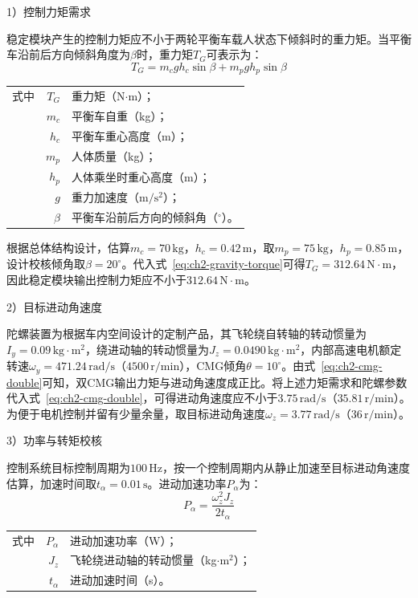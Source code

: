 1）控制力矩需求

稳定模块产生的控制力矩应不小于两轮平衡车载人状态下倾斜时的重力矩。当平衡车沿前后方向倾斜角度为$\beta$时，重力矩$T_G$可表示为：
\begin{equation}
T_G = m_c g h_c \sin\beta + m_p g h_p \sin\beta
\label{eq:ch2-gravity-torque}
\end{equation}
\begin{tabularx}{\textwidth}{@{}l@{\quad}r@{———}X@{}}
式中& $T_G$ & 重力矩（N$\cdot$m）；\\
& $m_c$ & 平衡车自重（kg）；\\
& $h_c$ & 平衡车重心高度（m）；\\
& $m_p$ & 人体质量（kg）；\\
& $h_p$ & 人体乘坐时重心高度（m）；\\
& $g$ & 重力加速度（$\mathrm{m/s^2}$）；\\
& $\beta$ & 平衡车沿前后方向的倾斜角（$^\circ$）。\\
\end{tabularx}\vspace{3.15bp}

根据总体结构设计，估算$m_c=70\,\mathrm{kg}$，$h_c=0.42\,\mathrm{m}$，取$m_p=75\,\mathrm{kg}$，$h_p=0.85\,\mathrm{m}$，设计校核倾角取$\beta=20^\circ$。代入式~\eqref{eq:ch2-gravity-torque}可得$T_G=312.64\,\mathrm{N\cdot m}$，因此稳定模块输出控制力矩应不小于$312.64\,\mathrm{N\cdot m}$。

2）目标进动角速度

陀螺装置为根据车内空间设计的定制产品，其飞轮绕自转轴的转动惯量为$I_y=0.09\,\mathrm{kg\cdot m^2}$，绕进动轴的转动惯量为$J_z=0.0490\,\mathrm{kg\cdot m^2}$，内部高速电机额定转速$\omega_y=471.24\,\mathrm{rad/s}$（$4500\,\mathrm{r/min}$），CMG倾角$\theta=10^\circ$。由式~\eqref{eq:ch2-cmg-double}可知，双CMG输出力矩与进动角速度成正比。将上述力矩需求和陀螺参数代入式~\eqref{eq:ch2-cmg-double}，可得进动角速度应不小于$3.75\,\mathrm{rad/s}$（$35.81\,\mathrm{r/min}$）。为便于电机控制并留有少量余量，取目标进动角速度$\omega_z=3.77\,\mathrm{rad/s}$（$36\,\mathrm{r/min}$）。

3）功率与转矩校核

控制系统目标控制周期为$100\,\mathrm{Hz}$，按一个控制周期内从静止加速至目标进动角速度估算，加速时间取$t_{\alpha}=0.01\,\mathrm{s}$。进动加速功率$P_{\alpha}$为：
\begin{equation}
P_{\alpha} = \frac{\omega_z^2 J_z}{2 t_{\alpha}}
\label{eq:ch2-power-acc}
\end{equation}
\begin{tabularx}{\textwidth}{@{}l@{\quad}r@{———}X@{}}
式中& $P_{\alpha}$ & 进动加速功率（W）；\\
& $J_z$ & 飞轮绕进动轴的转动惯量（kg$\cdot$m$^2$）；\\
& $t_{\alpha}$ & 进动加速时间（s）。\\
\end{tabularx}\vspace{3.15bp}

